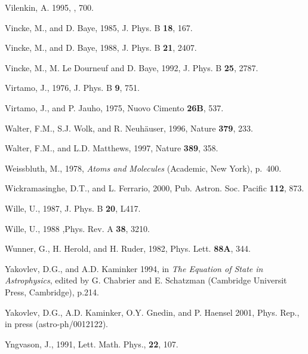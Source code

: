 \begin{references}
\harvarditem{}{}{}
Vilenkin, A. 1995, , 700.

\harvarditem{}{}{}
Vincke, M., and D. Baye, 1985, J. Phys. B {\bf 18}, 167.

\harvarditem{}{}{}
Vincke, M., and D. Baye, 1988, J. Phys. B {\bf 21}, 2407.

\harvarditem{}{}{}
Vincke, M., M. Le Dourneuf and D. Baye, 1992, J. Phys. B
{\bf 25}, 2787.

\harvarditem{}{}{}
Virtamo, J., 1976, J. Phys. B {\bf 9}, 751.

\harvarditem{}{}{}
Virtamo, J., and P. Jauho, 1975, Nuovo Cimento {\bf 26B}, 537.

\harvarditem{}{}{}
Walter, F.M., S.J. Wolk, and R. Neuh\"auser, 1996, Nature {\bf 379}, 233.

\harvarditem{}{}{}
Walter, F.M., and L.D. Matthews, 1997, Nature {\bf 389}, 358.

\harvarditem{}{}{}
Weissbluth, M., 1978, {\it Atoms and Molecules} (Academic, New York),
p.~400.

\harvarditem{}{}{}
Wickramasinghe, D.T., and L. Ferrario, 2000, Pub. Astron. Soc. Pacific
{\bf 112}, 873.

\harvarditem{}{}{}
Wille, U., 1987, J. Phys. B {\bf 20}, L417.

\harvarditem{}{}{}
Wille, U., 1988 ,Phys. Rev. A {\bf 38}, 3210.

\harvarditem{}{}{}
Wunner, G., H. Herold, and H. Ruder, 1982, Phys. Lett. {\bf 88A}, 344.


\harvarditem{}{}{}
Yakovlev, D.G., and A.D. Kaminker 1994, in {\it The Equation of State in
Astrophysics}, edited by G. Chabrier and E. Schatzman (Cambridge Universit
Press, Cambridge), p.214.

\harvarditem{}{}{}
Yakovlev, D.G., A.D. Kaminker, O.Y. Gnedin, and P. Haensel 2001, Phys. Rep.,
in press (astro-ph/0012122).

\harvarditem{}{}{}
Yngvason, J., 1991, Lett. Math. Phys., {\bf 22}, 107.


\end{references}
